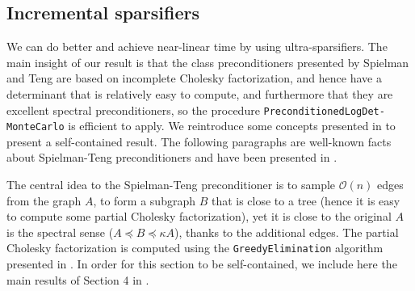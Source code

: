 


\subsection{Incremental sparsifiers\label{sec:Incremental-sparsifiers}}

We can do better and achieve near-linear time by using ultra-sparsifiers.
The main insight of our result is that the class preconditioners presented
by Spielman and Teng are based on incomplete Cholesky factorization,
and hence have a determinant that is relatively easy to compute, and
furthermore that they are excellent spectral preconditioners, so the
procedure \texttt{PreconditionedLogDet-MonteCarlo} is efficient to
apply. We reintroduce some concepts presented in \cite{Koutis2010}
to present a self-contained result. The following paragraphs are well-known
facts about Spielman-Teng preconditioners and have been presented
in \cite{Koutis2010,Spielman2009a}.

The central idea to the Spielman-Teng preconditioner is to sample
$\mathcal{O}\left(n\right)$ edges from the graph $A$, to form a
subgraph $B$ that is close to a tree (hence it is easy to compute
some partial Cholesky factorization), yet it is close to the original
$A$ is the spectral sense ($A\preceq B\preceq\kappa A$), thanks
to the additional edges. The partial Cholesky factorization is computed
using the \texttt{GreedyElimination} algorithm presented in \cite{Koutis2010}.
In order for this section to be self-contained, we include here the
main results of Section 4 in \cite{Spielman2009a}.

